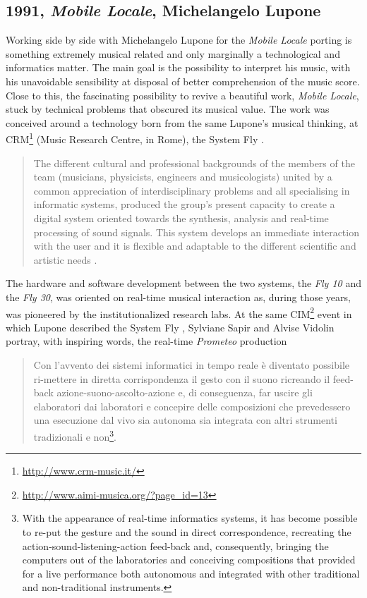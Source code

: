 \documentclass[twoside,a4paper]{article}
\begin{document}
\subsection{1991, \emph{Mobile Locale}, Michelangelo Lupone}

Working side by side with Michelangelo Lupone for the \emph{Mobile Locale} \cite{lmml91} porting is something extremely musical related and only marginally a technological and informatics matter. The main goal is the possibility to interpret his music, with his unavoidable sensibility at disposal of better comprehension of the music score. Close to this, the fascinating possibility to revive a beautiful work, \emph{Mobile Locale}, stuck by technical problems that obscured its musical value. The work was conceived around a technology born from the same Lupone's musical thinking, at CRM\footnote{\url{http://www.crm-music.it/}} (Music Research Centre, in Rome), the System Fly \cite{ml85}. 


\begin{quote}
The different cultural and professional backgrounds of the members of the team (musicians, physicists, engineers and musicologists) united by a common appreciation of interdisciplinary problems and all specialising in informatic systems, produced the group's present capacity to create a digital system oriented towards the synthesis, analysis and real-time processing of sound signals. This system develops an immediate interaction with the user and it is flexible and adaptable to the different scientific and artistic needs \cite{ml91}.
\end{quote}

The hardware and software development between the two systems, the \emph{Fly 10} and the \emph{Fly 30}, was oriented on real-time musical interaction as, during those years, was pioneered by the institutionalized research labs. At the same CIM\footnote{\url{http://www.aimi-musica.org/?page_id=13}} event in which Lupone described the System Fly \cite{ml85},  Sylviane Sapir and Alvise Vidolin \cite{savi85} portray, with inspiring words, the real-time \emph{Prometeo} production

\begin{quote}
Con l'avvento dei sistemi informatici in tempo reale è diventato possibile ri-mettere in diretta corrispondenza il gesto con il suono ricreando il feed-back azione-suono-ascolto-azione e, di conseguenza, far uscire gli elaboratori dai laboratori e concepire delle composizioni che prevedessero una esecuzione dal vivo sia autonoma sia integrata con altri strumenti tradizionali e non\footnote{With the appearance of real-time informatics systems, it has become possible to re-put the gesture and the sound in direct correspondence, recreating the action-sound-listening-action feed-back and, consequently, bringing the computers out of the laboratories and conceiving compositions that provided for a live performance both autonomous and integrated with other traditional and non-traditional instruments.}. 
\end{quote}
\end{document}
